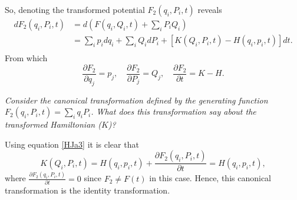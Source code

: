 So, denoting the transformed potential $F_2(q_i,P_i,t)$ reveals
\begin{equation}
	\begin{split}
		dF_2(q_i,P_i,t)&=d(F(q_i,Q_i,t)+\sum_iP_iQ_i)\\
		&=\sum_ip_idq_i+\sum_iQ_idP_i+[K(Q_i,P_i,t)-H(q_i,p_i,t)]dt.\\
	\end{split}
\end{equation}\normalsize
From which
\begin{equation}
	\frac{\partial F_2}{\partial q_j}=p_j, \quad \frac{\partial F_2}{\partial P_j}=Q_j, \quad \frac{\partial F_2}{\partial t}=K-H.
	\label{HJa3}
\end{equation} 

\begin{example}
	\emph{Consider the canonical transformation defined by the generating function $F_2(q_i,P_i,t)=\sum_iq_iP_i$. What does this transformation say about the transformed Hamiltonian ($K$)?}\newline 
	
	Using equation \eqref{HJa3} it is clear that
	\begin{equation}
		K(Q_i,P_i,t)=H(q_i,p_i,t)+\frac{\partial F_2(q_i,P_i,t)}{\partial t}=H(q_i,p_i,t),
	\end{equation} 
	where $\frac{\partial F_2(q_i,P_i,t)}{\partial t}=0$ since $F_2\neq F(t)$ in this case. Hence, this canonical transformation is the identity transformation.
\end{example}

